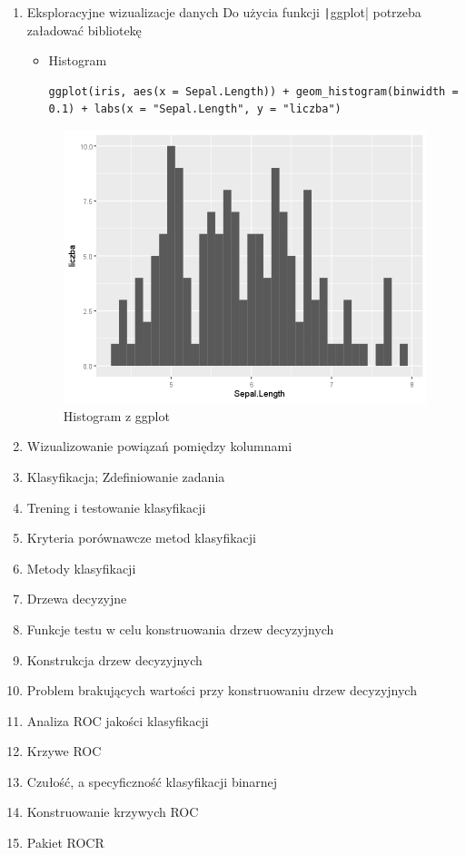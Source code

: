 \documentclass[11pt]{article}
\begin{document}
\begin{enumerate}
        \clearpage
        \item Eksploracyjne wizualizacje danych
        Do użycia funkcji \texttt|ggplot| potrzeba załadować bibliotekę
        \begin{itemize}
        	\item Histogram
        	\begin{verbatim}
ggplot(iris, aes(x = Sepal.Length)) + geom_histogram(binwidth = 0.1) + labs(x = "Sepal.Length", y = "liczba")
        	\end{verbatim}
        \end{itemize}
        \begin{figure}[H]
        	\begin{minipage}{.5\textwidth}
        		\centering
        		\includegraphics[width=\textwidth]{imgs/ggplot_hist}
        		\caption{Histogram z ggplot}
        	\end{minipage}
        \end{figure}
        
        \item Wizualizowanie powiązań pomiędzy kolumnami
        \item Klasyfikacja; Zdefiniowanie zadania
        \item Trening i testowanie klasyfikacji
        \item Kryteria porównawcze metod klasyfikacji
        \item Metody klasyfikacji
        \item Drzewa decyzyjne
        \item Funkcje testu w celu konstruowania drzew decyzyjnych
        \item Konstrukcja drzew decyzyjnych
        \item Problem brakujących wartości przy konstruowaniu drzew decyzyjnych
        \item Analiza ROC jakości klasyfikacji
        \item Krzywe ROC
        \item Czułość, a specyficzność klasyfikacji binarnej
        \item Konstruowanie krzywych ROC
        \item Pakiet ROCR
    \end{enumerate}
    
\end{document}
